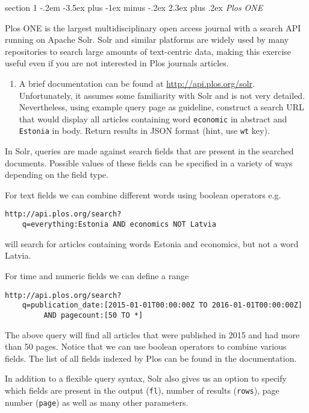 \documentclass[12pt]{article}
\makeatletter
\newenvironment{problem}{\@startsection
	{section}
	{1}
	{-.2em}
	{-3.5ex plus -1ex minus -.2ex}
	{2.3ex plus .2ex}
	{\pagebreak[3]%
		\large\bf\noindent{Exercise }
	}
}
{\vspace{0.8cm}}
\makeatother
\begin{document}
	\begin{problem}{\it Plos ONE}
	
	Plos ONE is the largest multidisciplinary open access journal with a search API running on Apache Solr. Solr and similar platforms are widely used by many repositories to search large amounts of text-centric data, making this exercise useful even if you are not interested in Plos journals articles.
	
	\begin{enumerate}[label=\textbf{\alph*)},leftmargin=*]
		\item A brief documentation can be found at \url{http://api.plos.org/solr}. Unfortunately, it assumes some familiarity with Solr and is not very detailed. Nevertheless, using example query page as guideline, construct a search URL that would display all articles containing word \texttt{economic} in abstract and \texttt{Estonia} in body. Return results in JSON format (hint, use \texttt{wt} key).
		
	\end{enumerate}
		
	\noindent 
	In Solr, queries are made against search fields that are present in the searched documents. Possible values of these fields can be specified in a variety of ways depending on the field type. 
	
	For text fields we can combine different words using boolean operators e.g.
	\begin{verbatim}
http://api.plos.org/search?
	q=everything:Estonia AND economics NOT Latvia
	\end{verbatim}	
	will search for articles containing words Estonia and economics, but not a word Latvia. 
	
	For time and numeric fields we can define a range
	\begin{verbatim}
http://api.plos.org/search?
	q=publication_date:[2015-01-01T00:00:00Z TO 2016-01-01T00:00:00Z]
		 AND pagecount:[50 TO *]
	\end{verbatim}	
	The above query will find all articles that were published in 2015 and had more than 50 pages. Notice that we can use boolean operators to combine various fields. The list of all fields indexed by Plos can be found in the documentation.
	
	In addition to a flexible query syntax, Solr also gives us an option to specify which fields are present in the output (\texttt{fl}), number of results (\texttt{rows}), page number (\texttt{page}) as well as many other parameters.
	

\end{problem}
\end{document}
